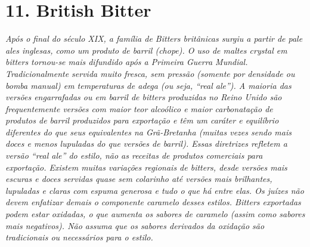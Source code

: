 \section*{11. British Bitter}
\textit{Após o final do século XIX, a família de Bitters britânicas surgiu a partir de pale ales inglesas, como um produto de barril (chope). O uso de maltes crystal em bitters tornou-se mais difundido após a Primeira Guerra Mundial. Tradicionalmente servida muito fresca, sem pressão (somente por densidade ou bomba manual) em temperaturas de adega (ou seja, “real ale”). A maioria das versões engarrafadas ou em barril de bitters produzidas no Reino Unido são frequentemente versões com maior teor alcoólico e maior carbonatação de produtos de barril produzidos para exportação e têm um caráter e equilíbrio diferentes do que seus equivalentes na Grã-Bretanha (muitas vezes sendo mais doces e menos lupuladas do que versões de barril). Essas diretrizes refletem a versão “real ale” do estilo, não as receitas de produtos comerciais para exportação. Existem muitas variações regionais de bitters, desde versões mais escuras e doces servidas quase sem colarinho até versões mais brilhantes, lupuladas e claras com espuma generosa e tudo o que há entre elas. Os juízes não devem enfatizar demais o componente caramelo desses estilos. Bitters exportadas podem estar oxidadas, o que aumenta os sabores de caramelo (assim como sabores mais negativos). Não assuma que os sabores derivados da oxidação são tradicionais ou necessários para o estilo.}